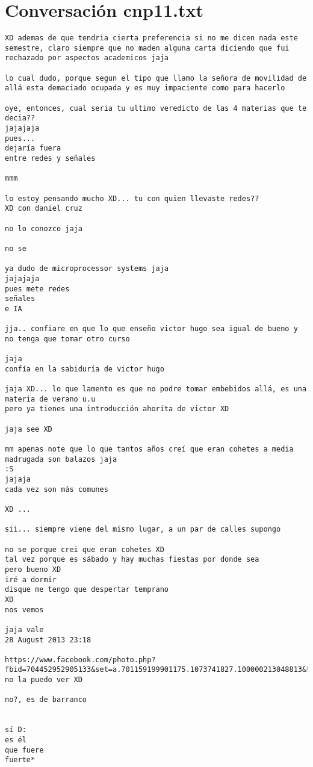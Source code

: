 \section{Conversaci\'on cnp11.txt}
\begin{verbatim}
XD ademas de que tendria cierta preferencia si no me dicen nada este semestre, claro siempre que no maden alguna carta diciendo que fui rechazado por aspectos academicos jaja

lo cual dudo, porque segun el tipo que llamo la señora de movilidad de allá esta demaciado ocupada y es muy impaciente como para hacerlo

oye, entonces, cual seria tu ultimo veredicto de las 4 materias que te decia??
jajajaja
pues...
dejaría fuera
entre redes y señales

mmm

lo estoy pensando mucho XD... tu con quien llevaste redes??
XD con daniel cruz

no lo conozco jaja

no se

ya dudo de microprocessor systems jaja
jajajaja
pues mete redes
señales
e IA

jja.. confiare en que lo que enseño victor hugo sea igual de bueno y no tenga que tomar otro curso

jaja
confía en la sabiduría de victor hugo

jaja XD... lo que lamento es que no podre tomar embebidos allá, es una materia de verano u.u
pero ya tienes una introducción ahorita de victor XD

jaja see XD

mm apenas note que lo que tantos años creí que eran cohetes a media madrugada son balazos jaja
:S
jajaja
cada vez son más comunes

XD ...

sii... siempre viene del mismo lugar, a un par de calles supongo

no se porque crei que eran cohetes XD
tal vez porque es sábado y hay muchas fiestas por donde sea
pero bueno XD
iré a dormir
disque me tengo que despertar temprano
XD
nos vemos

jaja vale
28 August 2013 23:18

https://www.facebook.com/photo.php?fbid=704452952905133&set=a.701159199901175.1073741827.100000213048813&type=1&theater
no la puedo ver XD

no?, es de barranco


sí D:
es él
que fuere
fuerte*


\end{verbatim}
